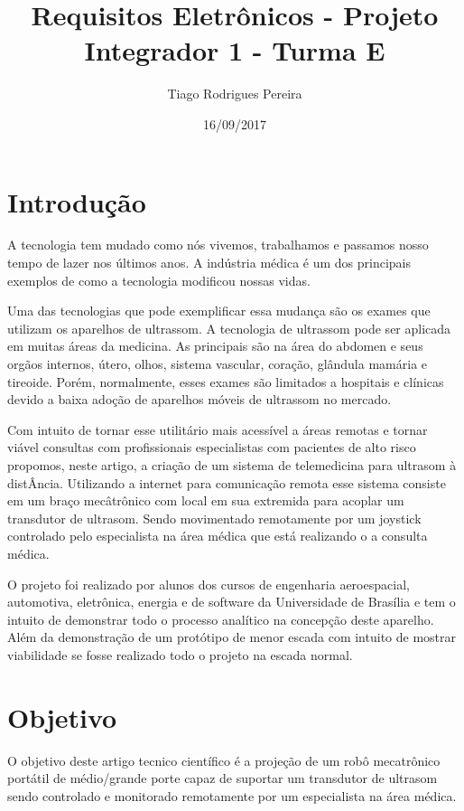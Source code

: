 \documentclass[a4paper]{article}
\title{Requisitos Eletrônicos - Projeto Integrador 1 - Turma E}
\author{Tiago Rodrigues Pereira}
\date{16/09/2017}
\begin{document}
\maketitle

\section{Introdução}

	A tecnologia tem mudado como nós vivemos, trabalhamos e passamos nosso tempo de lazer nos últimos anos. A indústria médica é um dos principais exemplos de como a tecnologia modificou nossas vidas. 

Uma das tecnologias que pode exemplificar essa mudança são os exames que utilizam os aparelhos de ultrassom. A tecnologia de ultrassom pode ser aplicada em muitas áreas da medicina. As principais são na área do abdomen e seus orgãos internos, útero, olhos, sistema vascular, coração, glândula mamária e tireoide. Porém, normalmente, esses exames são limitados a hospitais e clínicas devido a baixa adoção de aparelhos móveis de ultrassom no mercado.

Com intuito de tornar esse utilitário mais acessível a áreas remotas e tornar viável consultas com profissionais especialistas com pacientes de alto risco propomos, neste artigo, a criação de um sistema de telemedicina para ultrasom à distÂncia. Utilizando a internet para comunicação remota esse sistema consiste em um braço mecâtrônico com local em sua extremida para acoplar um transdutor de ultrasom. Sendo movimentado remotamente por um joystick controlado pelo especialista na área médica que está realizando o a consulta médica.

O projeto foi realizado por alunos dos cursos de engenharia aeroespacial, automotiva, eletrônica, energia e de software da Universidade de Brasília e tem o intuito de demonstrar todo o processo analítico na concepção deste aparelho. Além da demonstração de um protótipo de menor escada com intuito de mostrar viabilidade se fosse realizado todo o projeto na escada normal. 

\section{Objetivo}

	O objetivo deste artigo tecnico científico é a projeção de um robô mecatrônico portátil de médio/grande porte capaz de suportar um transdutor de ultrasom sendo controlado e monitorado remotamente por um especialista na área médica. 
\end{document}
